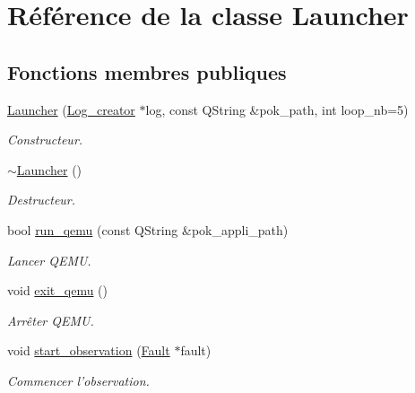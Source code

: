 \hypertarget{classLauncher}{
\section{Référence de la classe Launcher}
\label{classLauncher}
}
\subsection*{Fonctions membres publiques}
\begin{DoxyCompactItemize}
\item 
\hyperlink{classLauncher_accbe8ddda09f337abde5fd3e85fe9532}{Launcher} (\hyperlink{classLog__creator}{Log\_\-creator} $\ast$log, const QString \&pok\_\-path, int loop\_\-nb=5)
\begin{DoxyCompactList}\small\item\em Constructeur. \item\end{DoxyCompactList}\item 
\hypertarget{classLauncher_a7fb35def86a53bb0dce1267fe2adf019}{
\hyperlink{classLauncher_a7fb35def86a53bb0dce1267fe2adf019}{$\sim$Launcher} ()}
\label{classLauncher_a7fb35def86a53bb0dce1267fe2adf019}

\begin{DoxyCompactList}\small\item\em Destructeur. \item\end{DoxyCompactList}\item 
bool \hyperlink{classLauncher_abd99511c45d8633f2fc7211ba467e2dc}{run\_\-qemu} (const QString \&pok\_\-appli\_\-path)
\begin{DoxyCompactList}\small\item\em Lancer QEMU. \item\end{DoxyCompactList}\item 
\hypertarget{classLauncher_aef18c1ef86b51595e9b71dbc45fd796e}{
void \hyperlink{classLauncher_aef18c1ef86b51595e9b71dbc45fd796e}{exit\_\-qemu} ()}
\label{classLauncher_aef18c1ef86b51595e9b71dbc45fd796e}

\begin{DoxyCompactList}\small\item\em Arrêter QEMU. \item\end{DoxyCompactList}\item 
void \hyperlink{classLauncher_a0d057d62987a21971eaa9e49856e2327}{start\_\-observation} (\hyperlink{classFault}{Fault} $\ast$fault)
\begin{DoxyCompactList}\small\item\em Commencer l'observation. \item\end{DoxyCompactList}\end{DoxyCompactItemize}


